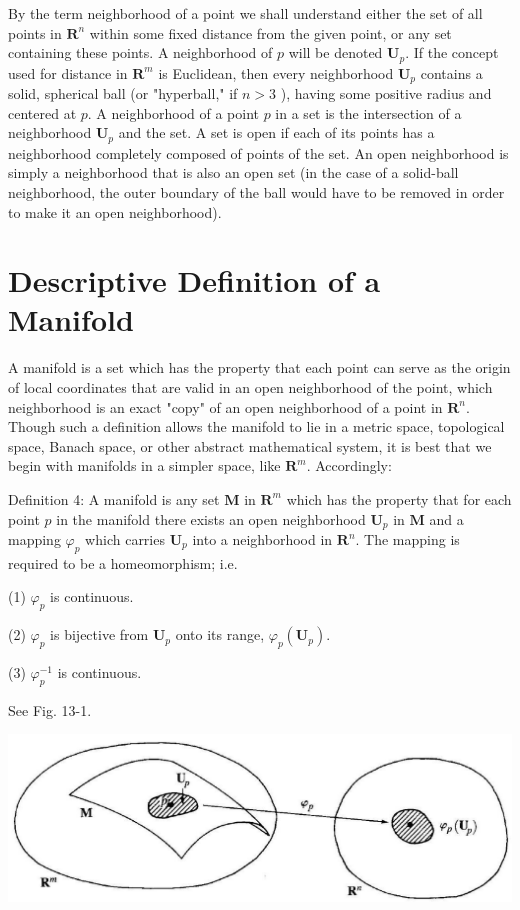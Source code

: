 \documentclass[10pt]{article}
\begin{document}
By the term neighborhood of a point we shall understand either the set of all points in $\mathbf{R}^{n}$ within some fixed distance from the given point, or any set containing these points. A neighborhood of $p$ will be denoted $\mathbf{U}_{p}$. If the concept used for distance in $\mathbf{R}^{m}$ is Euclidean, then every neighborhood $\mathbf{U}_{p}$ contains a solid, spherical ball (or "hyperball," if $n>3$ ), having some positive radius and centered at $p$. A neighborhood of a point $p$ in a set is the intersection of a neighborhood $\mathbf{U}_{p}$ and the set. A set is open if each of its points has a neighborhood completely composed of points of the set. An open neighborhood is simply a neighborhood that is also an open set (in the case of a solid-ball neighborhood, the outer boundary of the ball would have to be removed in order to make it an open neighborhood).

\section*{Descriptive Definition of a Manifold}
A manifold is a set which has the property that each point can serve as the origin of local coordinates that are valid in an open neighborhood of the point, which neighborhood is an exact "copy" of an open neighborhood of a point in $\mathbf{R}^{n}$. Though such a definition allows the manifold to lie in a metric space, topological space, Banach space, or other abstract mathematical system, it is best that we begin with manifolds in a simpler space, like $\mathbf{R}^{m}$. Accordingly:

Definition 4: A manifold is any set $\mathbf{M}$ in $\mathbf{R}^{m}$ which has the property that for each point $p$ in the manifold there exists an open neighborhood $\mathbf{U}_{p}$ in $\mathbf{M}$ and a mapping $\varphi_{p}$ which carries $\mathbf{U}_{p}$ into a neighborhood in $\mathbf{R}^{n}$. The mapping is required to be a homeomorphism; i.e.

(1) $\varphi_{p}$ is continuous.

(2) $\varphi_{p}$ is bijective from $\mathbf{U}_{p}$ onto its range, $\varphi_{p}\left(\mathbf{U}_{p}\right)$.

(3) $\varphi_{p}^{-1}$ is continuous.

See Fig. 13-1.

\begin{center}
\includegraphics[max width=\textwidth]{2024_04_03_41f90be4f896e21f0dc9g-204}
\end{center}
\end{document}
